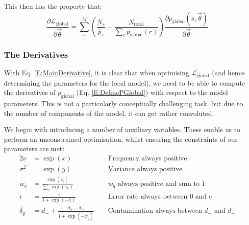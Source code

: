 \documentclass[fleqn,usenatbib]{mnras}
\newcommand{\eref}[1]{Eq. \eqref{#1}}
\newcommand{\pdiv}[2]{\frac{\partial #1}{\partial #2}}
\begin{document}
{{					This then has the property that:
					\begin{equation}
						\pdiv{\mathcal{L}_\text{global}}{\vec{\theta}} = \sum_s^M \left(\frac{N_s}{\bar{p}_s} - \frac{N_\text{total}}{\sum_r {p}_\text{global}(r)}\right) \pdiv{p_\text{global}(s,\vec{\theta})}{\vec{\theta}} \label{E:MainDerivative}
					\end{equation}
					
			
				\subsubsection{The Derivatives}

					With \eref{E:MainDerivative}, it is clear that when optimising $\mathcal{L}_\text{global}$ (and hence determining the parameters for the local model), we need to be able to compute the derivatives of $p_\text{global}$ (\eref{E:DefinePGlobal}) with respect to the model parameters. This is not a particularly conceptually challenging task, but due to the number of components of the model, it can get rather convoluted.
				
					We begin with introducing a number of auxiliary variables. These enable us to perform an unconstrained optimisation, whilst ensuring the constraints of our parameters are met:
					\begin{alignat}{2}
						\nu & = \exp(x) \quad && \text{Frequency always positive}
						\\
						\sigma^2 &= \exp(y) \quad && \text{Variance always positive}
						\\
						w_q & = \frac{\exp(z_q)}{\sum_r \exp(z_r)}\quad && \text{$w_q$ always positive and sum to 1}
						\\
						\epsilon & = \frac{e}{1+\exp(-\phi)} && \text{Error rate always between 0 and $e$}
						\\
						\delta_q & = d_- + \frac{d_+ - d_-}{1 + \exp(-\psi_q)} ~~&& \text{Contamination always between $d_-$ and $d_+$}
					\end{alignat}

}}
\end{document}
